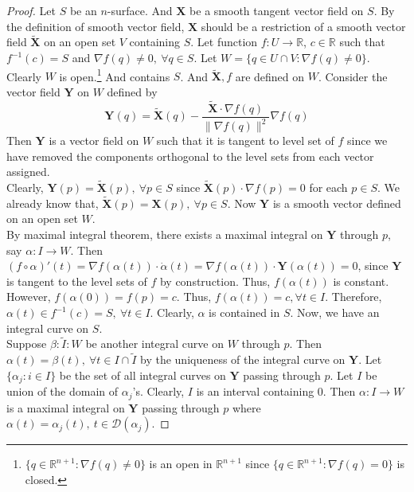 \begin{proof}
	Let $S$ be an $n$-surface. And $\boldsymbol{X}$ be a smooth tangent vector field on $S$. By the definition of smooth vector field, $\boldsymbol{X}$ should be a restriction of a smooth vector field $\tilde{\boldsymbol{X}}$ on an open set $V$ containing $S$. Let function $f : U \to \mathbb{R}$, $c \in \mathbb{R}$ such that $f^{-1}(c) = S$ and $\nabla f(q) \ne 0,\ \forall q \in S$. Let $W = \{ q \in U \cap V : \nabla f(q) \ne 0 \}$. Clearly $W$ is open.\footnote{$\{ q \in \mathbb{R}^{n+1} : \nabla f(q) \ne 0\}$ is an open in $\mathbb{R}^{n+1}$ since $\{ q \in \mathbb{R}^{n+1} : \nabla f(q) = 0 \}$ is closed.} And contains $S$. And $\tilde{\boldsymbol{X}}, f$ are defined on $W$. Consider the vector field $\boldsymbol{Y}$ on $W$ defined by
	$$ \boldsymbol{Y}(q) = \tilde{\boldsymbol{X}}(q) - \frac{\tilde{\boldsymbol{X}} \cdot \nabla f(q)}{\|\nabla f(q)\|^2} \nabla f(q) $$
	Then $\boldsymbol{Y}$ is a vector field on $W$ such that it is tangent to level set of $f$ since we have removed the components orthogonal to the level sets from each vector assigned.\\

	Clearly, $\boldsymbol{Y}(p) = \tilde{\boldsymbol{X}}(p),\ \forall p \in S$ since $\tilde{\boldsymbol{X}}(p) \cdot \nabla f(p) = 0$ for each $p \in S$.  We already know that, $\tilde{\boldsymbol{X}}(p) = \boldsymbol{X}(p),\ \forall p \in S$. Now $\boldsymbol{Y}$ is a smooth vector defined on an open set $W$.\\

	By maximal integral theorem, there exists a maximal integral on $\boldsymbol{Y}$ through $p$, say $\alpha : I \to W$.
	Then $(f \circ \alpha)'(t) = \nabla f(\alpha(t)) \cdot \dot\alpha(t) = \nabla f(\alpha(t)) \cdot \boldsymbol{Y}(\alpha(t)) = 0$, since $\boldsymbol{Y}$ is tangent to the level sets of $f$ by construction. Thus, $f(\alpha(t))$ is constant. However, $f(\alpha(0)) = f(p) = c$. Thus, $f(\alpha(t)) = c, \forall t \in I$. Therefore, $\alpha(t) \in f^{-1}(c) = S,\ \forall t \in I$. Clearly, $\alpha$ is contained in $S$. Now, we have an integral curve on $S$.\\

	Suppose $\beta : \tilde{I} : W$ be another integral curve on $W$ through $p$. Then $\alpha(t) = \beta(t),\ \forall t \in I \cap \tilde{I}$ by the uniqueness of the integral curve on $\boldsymbol{Y}$. Let $\{ \alpha_j : i \in I\}$ be the set of all integral curves on $\boldsymbol{Y}$ passing through $p$. Let $I$ be union of the domain of $\alpha_j$'s.  Clearly, $I$ is an interval containing $0$. Then $\alpha : I \to W$ is a maximal integral on $\boldsymbol{Y}$ passing through $p$ where $\alpha(t) = \alpha_j(t),\ t \in \mathscr{D}(\alpha_j)$.
\end{proof}


